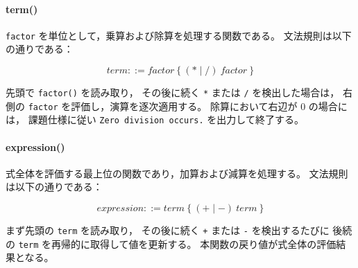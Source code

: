 \documentclass[a4paper,12pt,titlepage]{jsarticle}
\begin{document}
\paragraph{term()}
\verb|factor| を単位として，乗算および除算を処理する関数である。
文法規則は以下の通りである：

\[
term ::= factor\ \lbrace\ (* \mid /)\ factor\ \rbrace
\]

先頭で \verb|factor()| を読み取り，
その後に続く \verb|*| または \verb|/| を検出した場合は，
右側の \verb|factor| を評価し，演算を逐次適用する。
除算において右辺が 0 の場合には，
課題仕様に従い \verb|Zero division occurs.| を出力して終了する。

\paragraph{expression()}
式全体を評価する最上位の関数であり，加算および減算を処理する。
文法規則は以下の通りである：

\[
expression ::= term\ \lbrace\ (+ \mid -)\ term\ \rbrace
\]

まず先頭の \verb|term| を読み取り，
その後に続く \verb|+| または \verb|-| を検出するたびに
後続の \verb|term| を再帰的に取得して値を更新する。
本関数の戻り値が式全体の評価結果となる。

\newpage
\appendix
\end{document}
